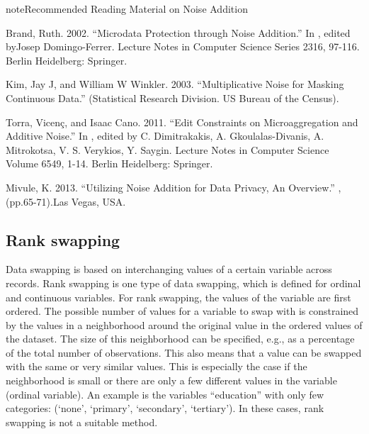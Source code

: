 \documentclass[letterpaper,10pt,english]{sphinxmanual}
\begin{document}
\begin{sphinxadmonition}{note}{Recommended Reading Material on Noise Addition}

Brand, Ruth. 2002. “Microdata Protection through Noise Addition.” In
,
edited byJosep Domingo-Ferrer. Lecture Notes in Computer Science Series
2316, 97-116. Berlin Heidelberg: Springer.

Kim, Jay J, and William W Winkler. 2003. “Multiplicative Noise for
Masking Continuous Data.”  (Statistical Research
Division. US Bureau of the Census).

Torra, Vicenç, and Isaac Cano. 2011. “Edit Constraints on
Microaggregation and Additive Noise.” In , edited by C. Dimitrakakis, A.
Gkoulalas-Divanis, A. Mitrokotsa, V. S. Verykios, Y. Saygin. Lecture
Notes in Computer Science Volume 6549, 1-14. Berlin Heidelberg:
Springer. 

Mivule, K. 2013. “Utilizing Noise Addition for Data Privacy, An
Overview.” , (pp.65-71).Las Vegas, USA.
\end{sphinxadmonition}


\subsection{Rank swapping}
\label{\detokenize{anon_methods:rank-swapping}}
Data swapping is based on interchanging values of a certain variable
across records. Rank swapping is one type of data swapping, which is
defined for ordinal and continuous variables. For rank swapping, the
values of the variable are first ordered. The possible number of values
for a variable to swap with is constrained by the values in a
neighborhood around the original value in the ordered values of the
dataset. The size of this neighborhood can be specified, e.g., as a
percentage of the total number of observations. This also means that a
value can be swapped with the same or very similar values. This is
especially the case if the neighborhood is small or there are only a few
different values in the variable (ordinal variable). An example is the
variables “education” with only few categories: (‘none’, ‘primary’,
‘secondary’, ‘tertiary’). In these cases, rank swapping is not a
suitable method.
\end{document}
